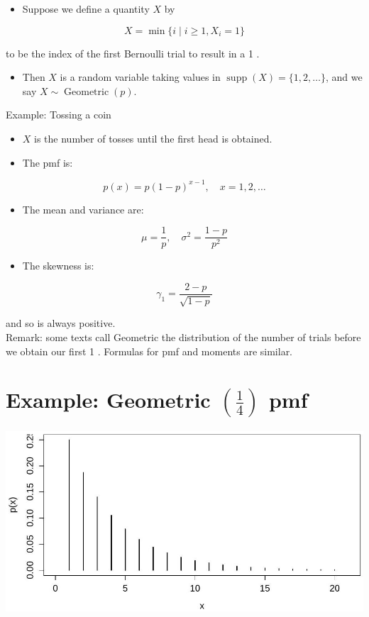\documentclass[10pt]{article}
\begin{document}
\begin{itemize}
  \item Suppose we define a quantity $X$ by
\end{itemize}

$$
X=\min \{i \mid i \geq 1, X_{i}=1\}
$$

to be the index of the first Bernoulli trial to result in a 1 .

\begin{itemize}
  \item Then $X$ is a random variable taking values in $\operatorname{supp}(X)=\{1,2, \ldots\}$, and we say $X \sim \operatorname{Geometric}(p)$.
\end{itemize}

Example: Tossing a coin

\begin{itemize}
  \item $X$ is the number of tosses until the first head is obtained.
  \item The pmf is:
\end{itemize}

$$
p(x)=p(1-p)^{x-1}, \quad x=1,2, \ldots
$$

\begin{itemize}
  \item The mean and variance are:
\end{itemize}

$$
\mu=\frac{1}{p}, \quad \sigma^{2}=\frac{1-p}{p^{2}}
$$

\begin{itemize}
  \item The skewness is:
\end{itemize}

$$
\gamma_{1}=\frac{2-p}{\sqrt{1-p}}
$$

and so is always positive.\\
Remark: some texts call Geometric the distribution of the number of trials before we obtain our first 1 . Formulas for pmf and moments are similar.

\section*{Example: Geometric $(\frac{1}{4})$ pmf}
\begin{center}
\includegraphics[max width=\textwidth]{2025_05_11_35704811148ad612caa6g-33}
\end{center}
\end{document}
